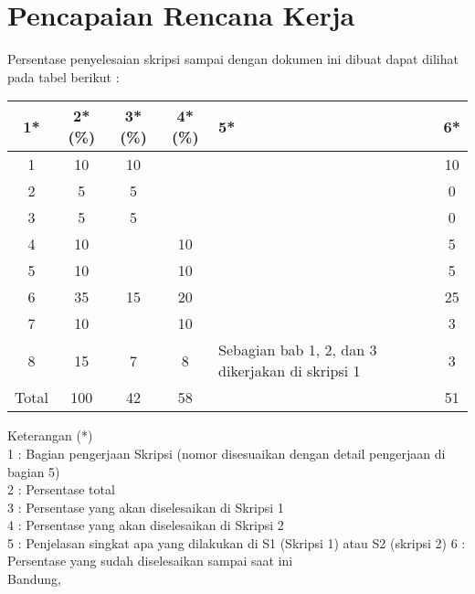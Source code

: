 \documentclass[a4paper,twoside]{article}
\begin{document}
\section{Pencapaian Rencana Kerja}
Persentase penyelesaian skripsi sampai dengan dokumen ini dibuat dapat dilihat pada tabel berikut :

\begin{center}
  \begin{tabular}{ | c | c | c | c | l | c |}
    \hline
    1*  & 2*(\%) & 3*(\%) & 4*(\%) &5* &6* \\ \hline \hline
    1   &  10 	&  10 &   &  & 10 \\ \hline
    2   &  5 	&  5 &   &  & 0 \\ \hline
	3   &  5 	&  5 &   & {\footnotesize }   & 0 \\ \hline
	4   &  10 	&   & 10  & {\footnotesize }  & 5 \\ \hline
	5   &  10 	&   & 10  & {\footnotesize }  & 5 \\ \hline
	6   &  35  	& 15 & 20  & {\footnotesize } & 25 \\ \hline
	7   &  10 	&   &  10 & {\footnotesize }  & 3 \\ \hline
	8   &  15 	& 7 & 8& {\footnotesize Sebagian bab 1, 2, dan 3 dikerjakan di skripsi 1 }  & 3 \\ \hline
    Total  & 100  & 42  & 58 &  & 51 \\ \hline
                          \end{tabular}
\end{center}


Keterangan (*)\\
1 : Bagian pengerjaan Skripsi (nomor disesuaikan dengan detail pengerjaan di bagian 5)\\
2 : Persentase total \\
3 : Persentase yang akan diselesaikan di Skripsi 1 \\
4 : Persentase yang akan diselesaikan di Skripsi 2 \\
5 : Penjelasan singkat apa yang dilakukan di S1 (Skripsi 1) atau S2 (skripsi 2)
6 : Persentase yang sudah diselesaikan sampai saat ini \\

\vspace{1cm}
\centering Bandung, \tanggal\\
\vspace{2cm} \nama \\ 
\vspace{1cm}
\end{document}
